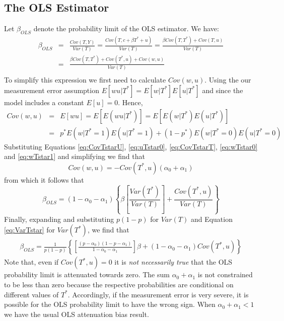 \subsection{The OLS Estimator}
Let $\beta_{OLS}$ denote the probability limit of the OLS estimator.
We have:
\begin{eqnarray*}
  \beta_{OLS} &=& \frac{Cov(T,Y)}{Var(T)} = \frac{Cov(T, c + \beta T^* + u)}{Var(T)} = \frac{\beta Cov(T,T^*) + Cov(T,u)}{Var(T)} \\
&=& \frac{\beta Cov(T,T^*) + Cov(T^*,u) + Cov(w,u)}{Var(T)} \\
\end{eqnarray*}
To simplify this expression we first need to calculate $Cov(w,u)$.
Using the our measurement error assumption $E[wu|T^*]=E[w|T^*]E[u|T^*]$ and since the model includes a constant $E[u]=0$.
Hence,
\begin{eqnarray*}
  Cov(w,u) &=& E[wu] = E\left[ E\left( wu|T^* \right) \right] = E\left[ E\left( w|T^* \right)E\left( u|T^* \right) \right] \\
  &=& p^* E\left( w|T^*=1 \right)E\left( u|T^*=1 \right) + \left( 1-p^* \right)E\left( w|T^*=0 \right)E(u |T^* = 0)
\end{eqnarray*}
Substituting Equations \ref{eq:CovTstarU}, \ref{eq:uTstar0}, \ref{eq:CovTstarT}, \ref{eq:wTstar0} and \ref{eq:wTstar1} and simplifying we find that
\begin{equation}
  Cov(w,u) = -Cov(T^*,u)(\alpha_0 + \alpha_1) 
  \label{eq:CovWU}
\end{equation}
from which it follows that
\begin{equation*}
  \beta_{OLS} = \left( 1 - \alpha_0 - \alpha_1 \right)\left\{ \beta \left[\frac{Var(T^*)}{Var(T)}\right] + \frac{Cov(T^*,u)}{Var(T)} \right\}
\end{equation*}
Finally, expanding and substituting $p(1-p)$ for $Var(T)$ and Equation \ref{eq:VarTstar} for $Var(T^*)$, we find that
\begin{eqnarray}
  \beta_{OLS} = \frac{1}{p(1-p)}\left\{ \left[ \frac{(p - \alpha_0)(1 - p - \alpha_1)}{1 - \alpha_0 - \alpha_1} \right] \beta + (1-\alpha_0-\alpha_1)Cov(T^*,u)\right\}
  \label{eq:plimOLS}
\end{eqnarray}
Note that, even if $Cov(T^*,u)=0$ it is \emph{not necessarily true} that the OLS probability limit is attenuated towards zero.
The sum $\alpha_0 + \alpha_1$ is not constrained to be less than zero because the respective probabilities are conditional on different values of $T^*$.
Accordingly, if the measurement error is very severe, it is possible for the OLS probability limit to have the wrong sign. 
When $\alpha_0 + \alpha_1 < 1$ we have the usual OLS attenuation bias result.

